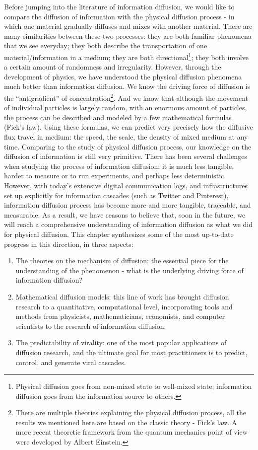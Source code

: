\documentclass[phd,tocprelim]{cornell}
\begin{document}
Before jumping into the literature of information diffusion, we would like to compare the diffusion of information with the physical diffusion process - in which one material gradually diffuses and mixes with another material. There are many similarities between these two processes: they are both familiar phenomena that we see everyday; they both describe the transportation of one material/information in a medium; they are both directional\footnote{Physical diffusion goes from non-mixed state to well-mixed state; information diffusion goes from the information source to others.}; they both involve a certain amount of randomness and irregularity. However, through the development of physics, we have understood the physical diffusion phenomena much better than information diffusion. We know the driving force of diffusion is the ``antigradient'' of concentration\footnote{There are multiple theories explaining the physical diffusion process, all the results we mentioned here are based on the classic theory - Fick's law. A more recent theoretic framework from the quantum mechanics point of view were developed by Albert Einstein\cite{einstein-1905}.}. And we know that although the movement of individual particles is largely random, with an enormous amount of particles, the process can be described and modeled by a few mathematical formulas (Fick's law\cite{Fick-1855}). 
Using these formulas, we can predict very precisely how the diffusive flux travel in medium: the speed, the scale, the density of mixed medium at any time. 
Comparing to the study of physical diffusion process, our knowledge on the diffusion of information is still very primitive. There has been several challenges when studying the process of information diffusion: it is much less tangible, harder to measure or to run experiments, and perhaps less deterministic. However, with today's extensive digital communication logs, and infrastructures set up explicitly for information cascades (such as Twitter and Pinterest), information diffusion process has become more and more tangible, traceable, and measurable. As a result, we have reasons to believe that, soon in the future, we will reach a comprehensive understanding of information diffusion as what we did for physical diffusion. This chapter synthesizes some of the most up-to-date progress in this direction, in three aspects:
\begin{enumerate}
\item The theories on the mechanism of diffusion: the essential piece for the understanding of the phenomenon - what is the underlying driving force of information diffusion?
\item Mathematical diffusion models: this line of work has brought diffusion research to a quantitative, computational level, incorporating tools and methods from physicists, mathematicians, economists, and computer scientists to the research of information diffusion.
\item The predictability of virality: one of the most popular applications of diffusion research, and the ultimate goal for most practitioners is to predict, control, and generate viral cascades.
\end{enumerate}
\end{document}
